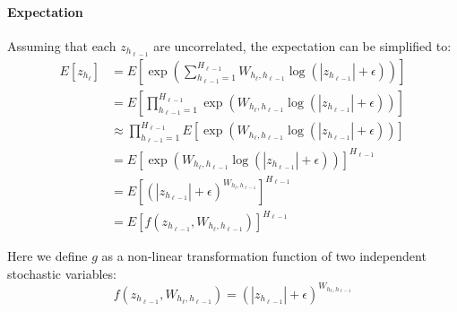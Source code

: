 \paragraph{Expectation} Assuming that each $z_{h_{\ell-1}}$ are uncorrelated, the expectation can be simplified to:
\begin{equation}
\begin{aligned}
E[z_{h_\ell}] &= E\left[\exp\left(\sum_{h_{\ell-1}=1}^{H_{\ell-1}} W_{h_{\ell}, h_{\ell-1}} \log(|z_{h_{\ell-1}}| + \epsilon) \right)\right] \\
&= E\left[\prod_{h_{\ell-1}=1}^{H_{\ell-1}} \exp(W_{h_{\ell}, h_{\ell-1}} \log(|z_{h_{\ell-1}}| + \epsilon)) \right] \\
&\approx \prod_{h_{\ell-1}=1}^{H_{\ell-1}} E[\exp(W_{h_{\ell}, h_{\ell-1}} \log(|z_{h_{\ell-1}}| + \epsilon))] \\
&= E[\exp(W_{h_{\ell}, h_{\ell-1}} \log(|z_{h_{\ell-1}}| + \epsilon))]^{H_{\ell-1}} \\
&= E\left[(|z_{h_{\ell-1}}| + \epsilon)^{W_{h_{\ell}, h_{\ell-1}}}\right]^{H_{\ell-1}} \\
&= E\left[f(z_{h_{\ell-1}}, W_{h_{\ell}, h_{\ell-1}})\right]^{H_{\ell-1}}
\end{aligned}
\end{equation}

Here we define $g$ as a non-linear transformation function of two independent stochastic variables:
\begin{equation}
f(z_{h_{\ell-1}}, W_{h_{\ell}, h_{\ell-1}}) = (|z_{h_{\ell-1}}| + \epsilon)^{W_{h_{\ell}, h_{\ell-1}}}
\end{equation}

